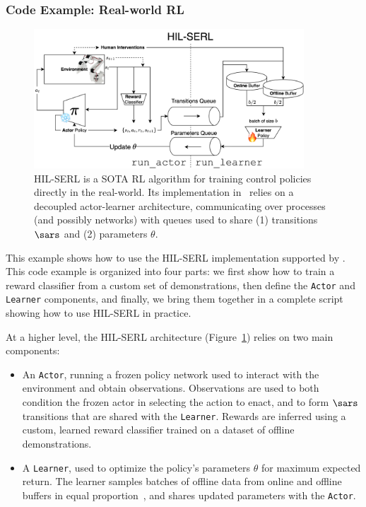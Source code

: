 \subsubsection{Code Example: Real-world RL}

\begin{figure}
    \centering
    \includegraphics[width=0.9\textwidth]{figures/ch3/ch3-hil-serl-architecture.png}
    \caption{HIL-SERL is a SOTA RL algorithm for training control policies directly in the real-world. Its implementation in \lerobot~relies on a decoupled actor-learner architecture, communicating over processes (and possibly networks) with queues used to share (1) transitions \( \sars \) and (2) parameters \( \theta \).}
    \label{fig:ch3-hil-serl-architecture}
\end{figure}

This example shows how to use the HIL-SERL implementation supported by \lerobot.
This code example is organized into four parts: we first show how to train a reward classifier from a custom set of demonstrations, then define the \texttt{Actor} and \texttt{Learner} components, and finally, we bring them together in a complete script showing how to use HIL-SERL in practice.

At a higher level, the HIL-SERL architecture (Figure~\ref{fig:ch3-hil-serl-architecture}) relies on two main components:
\begin{itemize}
    \item An \texttt{Actor}, running a frozen policy network used to interact with the environment and obtain observations. Observations are used to both condition the frozen actor in selecting the action to enact, and to form \( \sars \) transitions that are shared with the \texttt{Learner}. Rewards are inferred using a custom, learned reward classifier trained on a dataset of offline demonstrations.
    \item A \texttt{Learner}, used to optimize the policy's parameters \( \theta \) for maximum expected return. The learner samples batches of offline data from online and offline buffers in equal proportion~\citep{ballEfficientOnlineReinforcement2023}, and shares updated parameters with the \texttt{Actor}.
\end{itemize}


